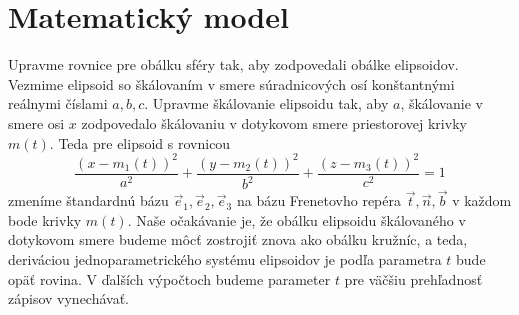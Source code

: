 \chapter{Matematický model}
\label{kap:matematicky_model}
Upravme rovnice pre obálku sféry tak, aby zodpovedali obálke elipsoidov. Vezmime elipsoid so škálovaním v smere súradnicových osí konštantnými reálnymi číslami $a,b,c.$ Upravme škálovanie elipsoidu tak, aby $a$, škálovanie v smere osi $x$ zodpovedalo škálovaniu v dotykovom smere priestorovej krivky $m(t).$
Teda pre elipsoid s rovnicou
\begin{equation*}
\frac{{(x - m_1(t))^2}}{{a^2}} + \frac{{(y - m_2(t))^2}}{{b^2}} + \frac{{(z - m_3(t))^2}}{{c^2}}= 1
\end{equation*} 
zmeníme štandardnú bázu $\vec{e}_1, \vec{e}_2, \vec{e}_3$ na bázu Frenetovho repéra $\vec{t}, \vec{n}, \vec{b}$ v každom bode krivky $m(t).$ Naše očakávanie je, že obálku  elipsoidu škálovaného v dotykovom smere budeme môcť zostrojiť znova ako obálku kružníc, a teda, deriváciou jednoparametrického systému elipsoidov je podľa parametra $t$ bude opäť rovina. V ďalších výpočtoch budeme parameter $t$ pre väčšiu prehľadnosť zápisov vynechávať.
